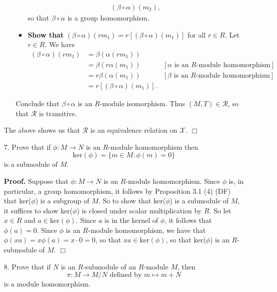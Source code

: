 \documentclass[9pt]{article}
\newcommand{\qed}{\hfill \ensuremath{\Box}}
\begin{document}
\begin{enumerate}
\begin{itemize}
\begin{itemize}
\begin{align*}
                                    (\beta\circ\alpha)(m_2),
                        \end{align*}
                        so that $\beta\circ\alpha$ is a group homomorphism.
                  \item \textbf{Show that }
                        $(\beta\circ\alpha)(rm_1) = r[(\beta\circ\alpha)(m_1)]$
                        for all $r \in R$. Let $r \in R$. We have
                        \begin{align*}
                           (\beta\circ\alpha)(rm_1) &= \beta(\alpha(rm_1)) \\
                              &= \beta(r\alpha(m_1))
                              &[\alpha \text{ is an }R
                                \text{-module homomorphism}] \\
                              &= r\beta(\alpha(m_1))
                              &[\beta \text{ is an }R
                                \text{-module homomorphism}] \\
                              &= r[(\beta\circ\alpha)(m_1)].
                        \end{align*}
               \end{itemize}
               Conclude that $\beta\circ\alpha$ is an $R$-module isomorphism.
               Thus $(M, T) \in \mathcal{R}$, so that $\mathcal{R}$ is
               transitive.
      \end{itemize}
      The above shows us that $\mathcal{R}$ is an equivalence relation on
      $\mathscr{X}$. \qed
   \item[7.]   Prove that if $\phi : M \rightarrow N$ is an $R$-module
               homomorphism then
               $$\text{ker}(\phi) = \{m \in M : \phi(m) = 0\}$$
               is a submodule of $M$.

      \textbf{Proof.} Suppose that $\phi : M \rightarrow N$ is an $R$-module
      homomorphism. Since $\phi$ is, in particular, a group homomorphism, it
      follows by Proposition 3.1 (4) (DF) that ker($\phi$) is a subgroup of $M$.
      So to show that ker($\phi$) is a submodule of $M$, it suffices to show
      ker($\phi$) is closed under scalar multiplication by $R$. So let $x \in R$
      and $a \in \text{ker}(\phi)$. Since $a$ is in the kernel of $\phi$, it
      follows that $\phi(a) = 0$. Since $\phi$ is an $R$-module homomorphism, we
      have that $\phi(xa) = x\phi(a) = x \cdot 0 = 0$, so that
      $xa \in \text{ker}(\phi)$, so that ker($\phi$) is an $R$-submodule of $M$.
      \qed
   \item[8.]   Prove that if $N$ is an $R$-submodule of an $R$-module $M$, then
               $$\pi : M \rightarrow M/N \text{ defined by } m \mapsto m + N$$
               is a module homomorphism.
\end{enumerate}
\end{document}
